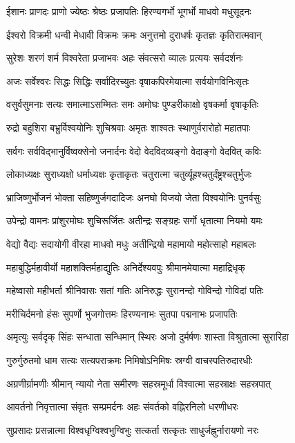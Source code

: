 \twolineshloka
{ईशानः प्राणदः प्राणो ज्येष्ठः श्रेष्ठः प्रजापतिः}
{हिरण्यगर्भो भूगर्भो माधवो मधुसूदनः}

\twolineshloka
{ईश्वरो विक्रमी धन्वी मेधावी विक्रमः क्रमः}
{अनुत्तमो दुराधर्षः कृतज्ञः कृतिरात्मवान्}

\twolineshloka
{सुरेशः शरणं शर्म विश्वरेता प्रजाभवः}
{अहः संवत्सरो व्यालः प्रत्ययः सर्वदर्शनः}

\twolineshloka
{अजः सर्वेश्वरः सिद्धः सिद्धिः सर्वादिरच्युतः}
{वृषाकपिरमेयात्मा सर्वयोगविनिःसृतः}

\twolineshloka
{वसुर्वसुमनाः सत्यः समात्माऽसम्मितः समः}
{अमोघः पुण्डरीकाक्षो वृषकर्मा वृषाकृतिः}

\twolineshloka
{रुद्रो बहुशिरा बभ्रुर्विश्वयोनिः शुचिश्रवाः}
{अमृतः शाश्वतः स्थाणुर्वरारोहो महातपाः}

\twolineshloka
{सर्वगः सर्वविद्भानुर्विष्वक्सेनो जनार्दनः}
{वेदो वेदविदव्यङ्गो वेदाङ्गो वेदवित् कविः}

\twolineshloka
{लोकाध्यक्षः सुराध्यक्षो धर्माध्यक्षः कृताकृतः}
{चतुरात्मा चतुर्व्यूहश्चतुर्दंष्ट्रश्चतुर्भुजः}

\twolineshloka
{भ्राजिष्णुर्भोजनं भोक्ता सहिष्णुर्जगदादिजः}
{अनघो विजयो जेता विश्वयोनिः पुनर्वसुः}

\twolineshloka
{उपेन्द्रो वामनः प्रांशुरमोघः शुचिरूर्जितः}
{अतीन्द्रः सङ्ग्रहः सर्गो धृतात्मा नियमो यमः}

\twolineshloka
{वेद्यो वैद्यः सदायोगी वीरहा माधवो मधुः}
{अतीन्द्रियो महामायो महोत्साहो महाबलः}

\twolineshloka
{महाबुद्धिर्महावीर्यो महाशक्तिर्महाद्युतिः}
{अनिर्देश्यवपुः श्रीमानमेयात्मा महाद्रिधृक्}

\twolineshloka
{महेष्वासो महीभर्ता श्रीनिवासः सतां गतिः}
{अनिरुद्धः सुरानन्दो गोविन्दो गोविदां पतिः}

\twolineshloka
{मरीचिर्दमनो हंसः सुपर्णो भुजगोत्तमः}
{हिरण्यनाभः सुतपा पद्मनाभः प्रजापतिः}

\twolineshloka
{अमृत्युः सर्वदृक् सिंहः सन्धाता सन्धिमान् स्थिरः}
{अजो दुर्मर्षणः शास्ता विश्रुतात्मा सुरारिहा}

\twolineshloka
{गुरुर्गुरुतमो धाम सत्यः सत्यपराक्रमः}
{निमिषोऽनिमिषः स्रग्वी वाचस्पतिरुदारधीः}

\twolineshloka
{अग्रणीर्ग्रामणीः श्रीमान् न्यायो नेता समीरणः}
{सहस्रमूर्धा विश्वात्मा सहस्राक्षः सहस्रपात्}

\twolineshloka
{आवर्तनो निवृत्तात्मा संवृतः सम्प्रमर्दनः}
{अहः संवर्तको वह्निरनिलो धरणीधरः}

\twolineshloka
{सुप्रसादः प्रसन्नात्मा विश्वधृग्विश्वभुग्विभुः}
{सत्कर्ता सत्कृतः साधुर्जह्नुर्नारायणो नरः}

